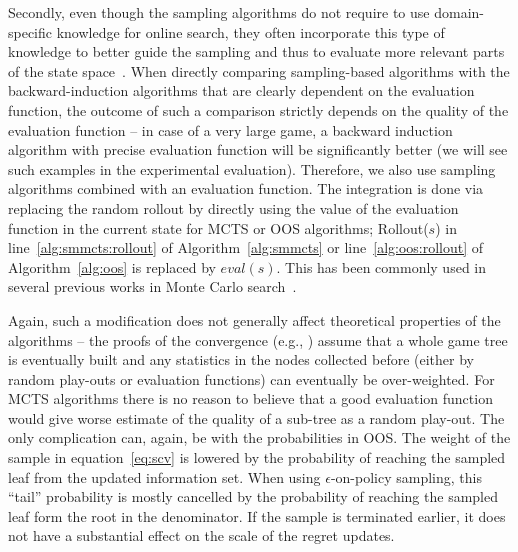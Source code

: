 Secondly, even though the sampling algorithms do not require to use domain-specific knowledge for online search, they often incorporate this type of knowledge to better guide the sampling and thus to evaluate more relevant parts of the state space~\cite{Gelly07Combining,Lorentz08Amazons,Winands09eval,Winands10MCTS-LOA,Winands11AB,Lorentz13Breakthrough,Lanctot14Implicit}. When directly comparing sampling-based algorithms with the backward-induction algorithms that are clearly dependent on the evaluation function, the outcome of such a comparison strictly depends on the quality of the evaluation function -- in case of a very large game, a backward induction algorithm with precise evaluation function will be significantly better (we will see such examples in the experimental evaluation). Therefore, we also use sampling algorithms combined with an evaluation function. The integration is done via replacing the random rollout  
by directly using the value of the evaluation function in the current state for MCTS or OOS algorithms; \ie Rollout($s$) in 
line~\ref{alg:smmcts:rollout} of Algorithm~\ref{alg:smmcts} or line~\ref{alg:oos:rollout} of Algorithm~\ref{alg:oos} is replaced by $eval(s)$. 
This has been commonly used in several previous works in Monte Carlo search~\cite{Lorentz08Amazons,Lorentz13Breakthrough,Lanctot14Implicit,RamanujanS11,Lanctot13MCMS}.

Again, such a modification does not generally affect theoretical properties of the algorithms -- the proofs of the convergence (e.g., \cite{lisy2013-nips}) assume that a whole game tree is eventually built and any statistics in the nodes collected before (either by random play-outs or evaluation functions) can eventually be over-weighted. For MCTS algorithms there is no reason to believe that a good evaluation function would give worse estimate of the quality of a sub-tree as a random play-out. The only complication can, again, be with the probabilities in OOS. The weight of the sample in equation~\ref{eq:scv} is lowered by the probability of reaching the sampled leaf from the updated information set. When using $\epsilon$-on-policy sampling, this ``tail'' probability is mostly cancelled by the probability of reaching the sampled leaf form the root in the denominator. If the sample is terminated earlier, it does not have a substantial effect on the scale of the regret updates.
